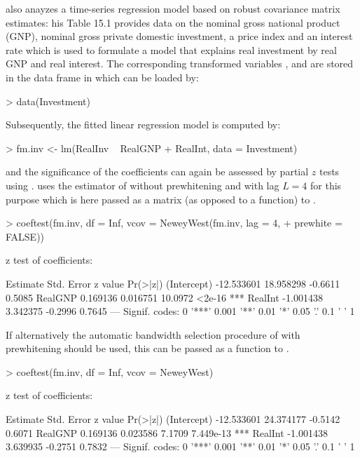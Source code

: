 \documentclass{Z}
\begin{document}
\cite{hac:Greene:1993} also anayzes a time-series regression model
based on robust covariance matrix estimates: his Table 15.1 provides
data on the nominal gross national product (GNP), nominal gross private
domestic investment, a price index and an interest rate which is used
to formulate a model that explains real investment by real GNP and real
interest. The corresponding transformed variables , 
and  are stored in the data frame  in
 which can be loaded by:
\begin{Schunk}
\begin{Sinput}
> data(Investment)
\end{Sinput}
\end{Schunk}
Subsequently, the fitted linear regression model is computed by:
\begin{Schunk}
\begin{Sinput}
> fm.inv <- lm(RealInv ~ RealGNP + RealInt, data = Investment)
\end{Sinput}
\end{Schunk}
and the significance of the coefficients can again be assessed
by partial $z$ tests using . \cite{hac:Greene:1993}
uses the estimator of \cite{hac:Newey+West:1987} without prewhitening and
with lag $L = 4$ for this purpose which is here passed as a matrix (as opposed to a function)
to .
\begin{Schunk}
\begin{Sinput}
> coeftest(fm.inv, df = Inf, vcov = NeweyWest(fm.inv, lag = 4, 
+     prewhite = FALSE))
\end{Sinput}
\begin{Soutput}
z test of coefficients:

              Estimate Std. Error z value Pr(>|z|)    
(Intercept) -12.533601  18.958298 -0.6611   0.5085    
RealGNP       0.169136   0.016751 10.0972   <2e-16 ***
RealInt      -1.001438   3.342375 -0.2996   0.7645    
---
Signif. codes:  0 '***' 0.001 '**' 0.01 '*' 0.05 '.' 0.1 ' ' 1 
\end{Soutput}
\end{Schunk}
If alternatively the automatic bandwidth selection procedure of \cite{hac:Newey+West:1994}
with prewhitening should be used, this can be passed as a function to .
\begin{Schunk}
\begin{Sinput}
> coeftest(fm.inv, df = Inf, vcov = NeweyWest)
\end{Sinput}
\begin{Soutput}
z test of coefficients:

              Estimate Std. Error z value  Pr(>|z|)    
(Intercept) -12.533601  24.374177 -0.5142    0.6071    
RealGNP       0.169136   0.023586  7.1709 7.449e-13 ***
RealInt      -1.001438   3.639935 -0.2751    0.7832    
---
Signif. codes:  0 '***' 0.001 '**' 0.01 '*' 0.05 '.' 0.1 ' ' 1 
\end{Soutput}
\end{Schunk}
\end{document}
